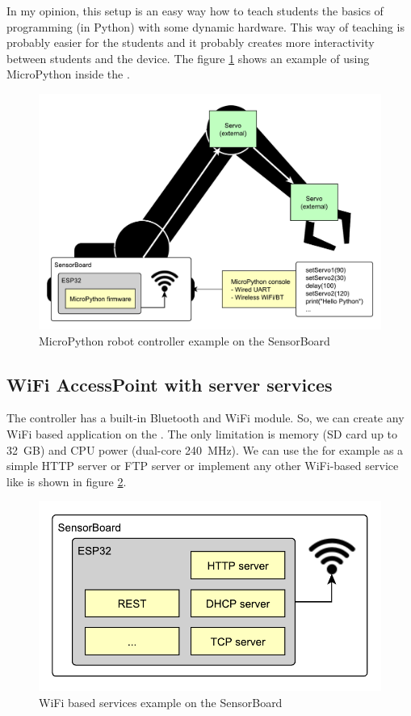 In my opinion, this setup is an easy way how to teach students the basics of programming (in Python) with some dynamic hardware. This way of teaching is probably easier for the students and it probably creates more interactivity between students and the device. The figure \ref{UEMicroPython} shows an example of using MicroPython inside the .

\begin{figure}
    \centering
    \caption{MicroPython robot controller example on the SensorBoard}
    \label{UEMicroPython}
    \includegraphics[width=\linewidth]{img/UsageExamplesPythonRobot.pdf}
\end{figure}

\subsection{WiFi AccessPoint with server services}
The  controller has a built-in Bluetooth and WiFi module. So, we can create any WiFi based application on the . The only limitation is memory (SD card up to \SI{32}{GB}) and CPU power (dual-core \SI{240}{MHz}). We can use the  for example as a simple HTTP server \cite{ESP32:HTTPserver} or FTP server \cite{ESP32:FTPserver} or implement any other WiFi-based service like is shown in figure \ref{UEWiFi}.

\begin{figure}
    \centering
    \caption{WiFi based services example on the SensorBoard}
    \label{UEWiFi}
    \includegraphics[scale=1]{img/UsageExamplesServer.pdf}
\end{figure}

